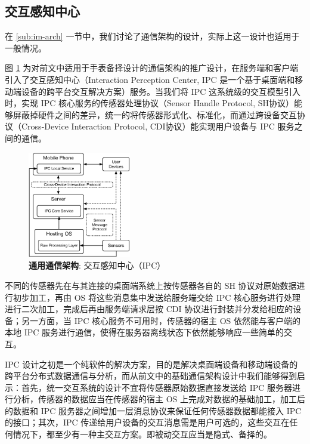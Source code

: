 \subsection{交互感知中心}

在 \ref{sub:im-arch} 一节中，我们讨论了通信架构的设计，实际上这一设计也适用于一般情况。

图 \ref{fig:universe-arch} 为对前文中适用于手表备择设计的通信架构的推广设计，在服务端和客户端引入了交互感知中心（Interaction Perception Center, IPC 是一个基于桌面端和移动端设备的跨平台交互解决方案）服务\cite{Changkun:2015ipc}。当我们将 IPC 这系统级的交互模型引入时，实现 IPC 核心服务的传感器处理协议（Sensor Handle Protocol, SH协议）能够屏蔽掉硬件之间的差异，统一的将传感器形式化、标准化，而通过跨设备交互协议（Cross-Device Interaction Protocol, CDI协议）能实现用户设备与 IPC 服务之间的通信。

\begin{figure}[H]
    \centering
    \includegraphics[width=0.4\textwidth]{figures/universe-arch}
    \caption{\kaishu \textbf{通用通信架构}: 交互感知中心（IPC）}
    \label{fig:universe-arch}
\end{figure}

不同的传感器先在与其连接的桌面端系统上按传感器各自的 SH 协议对原始数据进行初步加工，再由 OS 将这些消息集中发送给服务端交给 IPC 核心服务进行处理进行二次加工，完成后再由服务端请求层按 CDI 协议进行封装并分发给相应的设备；另一方面，当 IPC 核心服务不可用时，传感器的宿主 OS 依然能与客户端的本地 IPC 服务进行通信，使得在服务器离线状态下依然能够响应一些简单的交互。

IPC 设计之初是一个纯软件的解决方案，目的是解决桌面端设备和移动端设备的跨平台分布式数据通信与分析，而从前文中的基础通信架构设计中我们能够得到启示：首先，统一交互系统的设计不宜将传感器原始数据直接发送给 IPC 服务器进行分析，传感器的数据应当在传感器的宿主 OS 上完成对数据的基础加工，加工后的数据和 IPC 服务器之间增加一层消息协议来保证任何传感器数据都能接入 IPC 的接口；其次，IPC 传递给用户设备的交互消息需是用户可选的，这些交互在任何情况下，都至少有一种主交互方案。即被动交互应当是隐式、备择的。

